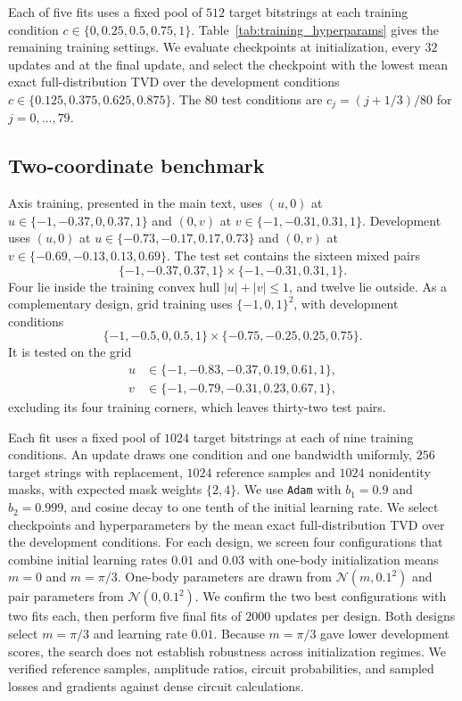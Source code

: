\documentclass[pra,aps,10pt,twocolumn,floatfix,superscriptaddress, notitlepage,longbibliography]{revtex4-2}
\begin{document}
Each of five fits uses a fixed pool of $512$ target bitstrings at each training condition $c\in\{0,0.25,0.5,0.75,1\}$. Table~\ref{tab:training_hyperparams} gives the remaining training settings. We evaluate checkpoints at initialization, every $32$ updates and at the final update, and select the checkpoint with the lowest mean exact full-distribution TVD over the development conditions $c\in\{0.125,0.375,0.625,0.875\}$. The $80$ test conditions are $c_j=(j+1/3)/80$ for $j=0,\ldots,79$.

\subsection{Two-coordinate benchmark}
\label{sec:gaussian-two-dimensional-protocol}

Axis training, presented in the main text, uses $(u,0)$ at $u\in\{-1,-0.37,0,0.37,1\}$ and $(0,v)$ at $v\in\{-1,-0.31,0.31,1\}$. Development uses $(u,0)$ at $u\in\{-0.73,-0.17,0.17,0.73\}$ and $(0,v)$ at $v\in\{-0.69,-0.13,0.13,0.69\}$. The test set contains the sixteen mixed pairs
\[
 \{-1,-0.37,0.37,1\}\times\{-1,-0.31,0.31,1\}.
\]
Four lie inside the training convex hull $|u|+|v|\leq1$, and twelve lie outside. As a complementary design, grid training uses $\{-1,0,1\}^2$, with development conditions
\[
 \{-1,-0.5,0,0.5,1\}\times\{-0.75,-0.25,0.25,0.75\}.
\]
It is tested on the grid
\begin{align*}
 u&\in\{-1,-0.83,-0.37,0.19,0.61,1\},\\
 v&\in\{-1,-0.79,-0.31,0.23,0.67,1\},
\end{align*}
excluding its four training corners, which leaves thirty-two test pairs.

Each fit uses a fixed pool of $1024$ target bitstrings at each of nine training conditions. An update draws one condition and one bandwidth uniformly, $256$ target strings with replacement, $1024$ reference samples and $1024$ nonidentity masks, with expected mask weights $\{2,4\}$. We use \texttt{Adam} with $b_1=0.9$ and $b_2=0.999$, and cosine decay to one tenth of the initial learning rate. We select checkpoints and hyperparameters by the mean exact full-distribution TVD over the development conditions. For each design, we screen four configurations that combine initial learning rates $0.01$ and $0.03$ with one-body initialization means $m=0$ and $m=\pi/3$. One-body parameters are drawn from $\mathcal N(m,0.1^2)$ and pair parameters from $\mathcal N(0,0.1^2)$. We confirm the two best configurations with two fits each, then perform five final fits of $2000$ updates per design. Both designs select $m=\pi/3$ and learning rate $0.01$. Because $m=\pi/3$ gave lower development scores, the search does not establish robustness across initialization regimes. We verified reference samples, amplitude ratios, circuit probabilities, and sampled losses and gradients against dense circuit calculations.
\end{document}
